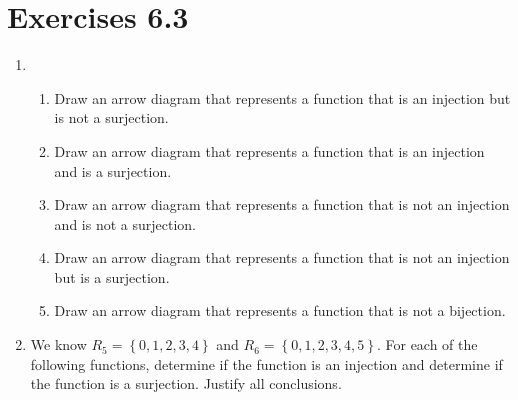 \section*{Exercises 6.3}
%
\begin{enumerate}
%
%
%

\item \begin{enumerate} \item Draw an arrow diagram that represents a function that is an injection but is not a surjection.

  \item Draw an arrow diagram that represents a function that is an injection and is a surjection.

  \item Draw an arrow diagram that represents a function that is not an injection and is not a surjection.

  \item Draw an arrow diagram that represents a function that is not an injection but is a surjection.

  \item Draw an arrow diagram that represents a function that is not a bijection.
\end{enumerate}

\item \label{exer:sec63-mod5function} We know  $R_5  = \left\{ {0, 1, 2, 3, 4} \right\}$ and $R_6  = \left\{ {0, 1, 2, 3, 4, 5} \right\}$.  For each of the following functions, determine if the function is an injection and determine if the function is a surjection.  Justify all conclusions.


\end{enumerate}
